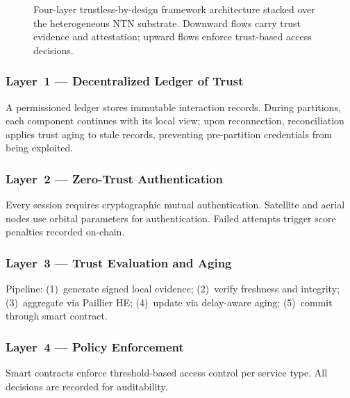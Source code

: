 \documentclass[journal,twoside,10pt]{IEEEtran}
\begin{document}
\begin{figure}[t]
\caption{Four-layer trustless-by-design framework architecture stacked
         over the heterogeneous NTN substrate. Downward flows carry
         trust evidence and attestation; upward flows enforce
         trust-based access decisions.}
\label{fig:architecture}
\end{figure}

\subsubsection{Layer~1 --- Decentralized Ledger of Trust}
A permissioned ledger stores immutable interaction records.
During partitions, each component continues with its local view;
upon reconnection, reconciliation applies trust aging to stale records,
preventing pre-partition credentials from being exploited.

\subsubsection{Layer~2 --- Zero-Trust Authentication}
Every session requires cryptographic mutual authentication.
Satellite and aerial nodes use orbital parameters for authentication.
Failed attempts trigger score penalties recorded on-chain.

\subsubsection{Layer~3 --- Trust Evaluation and Aging}
Pipeline: (1)~generate signed local evidence; (2)~verify freshness and
integrity; (3)~aggregate via Paillier HE; (4)~update via delay-aware
aging; (5)~commit through smart contract.

\subsubsection{Layer~4 --- Policy Enforcement}
Smart contracts enforce threshold-based access control per service type.
All decisions are recorded for auditability.
\end{document}
